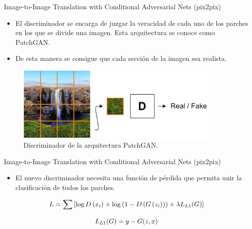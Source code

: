 \begin{frame}{Image-to-Image Translation with Conditional Adversarial Nets (pix2pix)\cite{isola2017image}}

    \begin{itemize}
        \item El discriminador se encarga de juzgar la veracidad de cada uno de los \alert{parches} en los que se divide una imagen. Esta arquitectura se conoce como \alert{PatchGAN}\cite{isola2017image}.
        \item De esta manera se consigue que cada sección de la imagen sea realista.
    \end{itemize}
    
    \begin{figure}
        \centering
        \includegraphics[width=0.9\textwidth]{Slides/figures/GAN/pix2pix Discriminador.png}
        \caption{Discriminador de la arquitectura PatchGAN\cite{isola2017image}.}
    \end{figure}
    
\end{frame}

\begin{frame}{Image-to-Image Translation with Conditional Adversarial Nets (pix2pix)\cite{isola2017image}}

    \begin{itemize}
        \item El nuevo discriminador necesita una \alert{función de pérdida} que permita unir la clasificación de todos los \alert{parches}.
    \end{itemize}
    
    \begin{equation}
        \large L=\sum\left[\log D\left(x_{i}\right)+\log \left(1-D\left(G\left(z_{i}\right)\right)\right)+\lambda L_{L 1}(G)\right]
    \end{equation}
    
    \begin{equation}
        \large L_{L 1}(G)=y-G(z, x)
    \end{equation}
    
\end{frame}


